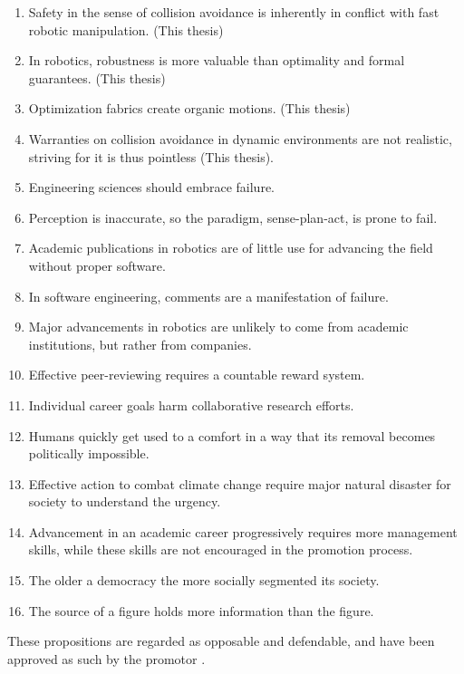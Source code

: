 \documentclass[nativefonts]{TUD-dissertation2020}
\begin{document}
\begin{enumerate}

  \item Safety in the sense of collision avoidance is inherently in conflict
    with fast robotic manipulation. (This thesis)
  \item In robotics, robustness is more valuable than optimality and formal
    guarantees. (This thesis)
  \item Optimization fabrics create organic motions. (This thesis)
  \item Warranties on collision avoidance in dynamic environments are not
    realistic, striving for it is thus pointless (This thesis).
  \item Engineering sciences should embrace failure.
  \item Perception is inaccurate, so the paradigm, sense-plan-act, is prone to
    fail.
  \item Academic publications in robotics are of little use for advancing the
    field without proper software.
  \item In software engineering, comments are a manifestation of failure.
  \item Major advancements in robotics are unlikely to come from academic
    institutions, but rather from companies.
  \item Effective peer-reviewing requires a countable reward system.
  \item Individual career goals harm collaborative research efforts.
  \item Humans quickly get used to a comfort in a way that its removal becomes
    politically impossible.
  \item Effective action to combat climate change require major natural disaster
    for society to understand the urgency.
  \item Advancement in an academic career progressively requires more management
    skills, while these skills are not encouraged in the promotion process.
  \item The older a democracy the more socially segmented its society.
  \item The source of a figure holds more information than the figure.
\end{enumerate}

\bigskip
\bigskip

\begin{center}
These propositions are regarded as opposable and defendable, and have been
  approved as such by the promotor \promotor{}.
\end{center}

\clearpage
\end{document}
